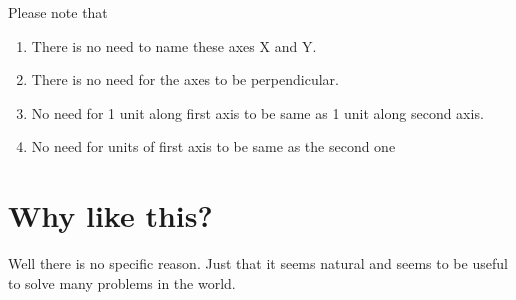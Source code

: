 \documentclass[12pt]{article}
\newcommand{\comment}[1]{}
\begin{document}
\begin{figure}[h]
  \centering
\end{figure}

Please note that
\begin{enumerate}
  \item There is no need to name these axes X and Y.
  \item There is no need for the axes to be perpendicular.
  \item No need for 1 unit along first axis to be same as 1 unit along second axis.
  \item No need for units of first axis to be same as the second one
\end{enumerate}

\section{Why like this?}
Well there is no specific reason. Just that it seems natural and seems to be useful to solve many problems in the world.
\end{document}
